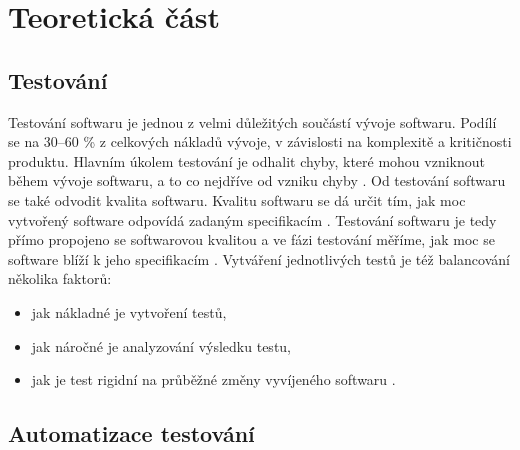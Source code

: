 \chapter{Teoretická část} %


\section{Testování}


Testování softwaru je jednou z velmi důležitých součástí vývoje softwaru. Podílí se na 30--60 \% z celkových nákladů vývoje, v závislosti na komplexitě a kritičnosti produktu.
Hlavním úkolem testování je odhalit chyby, které mohou vzniknout během vývoje softwaru, a to co nejdříve od vzniku chyby \cite{test_automation}. Od testování softwaru se také odvodit kvalita softwaru. Kvalitu softwaru se dá určit tím, jak moc vytvořený software odpovídá zadaným specifikacím \cite{software_quality}. Testování softwaru je tedy přímo propojeno se softwarovou kvalitou a ve fázi testování měříme, jak moc se software blíží k jeho specifikacím \cite{KUMAR20168}. Vytváření jednotlivých testů je též balancování několika faktorů:
\begin{itemize}
    \item jak nákladné je vytvoření testů,
    \item jak náročné je analyzování výsledku testu,
    \item jak je test rigidní na průběžné změny vyvíjeného softwaru \cite{fewster1999software}.
\end{itemize}


\section{Automatizace testování}


